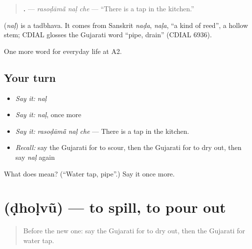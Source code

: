 \begin{quote}
\textbf{  .} — \emph{rasoḍāmā̃ naḷ che} — \textquotedblleft{}There is a tap in the kitchen.\textquotedblright{}
\end{quote}

\begin{cousinweb}
\textbf{} (\emph{naḷ}) is a tadbhava. It comes from Sanskrit \emph{naḍa}, \emph{naḷa}, \textquotedblleft{}a kind of reed\textquotedblright{}, a hollow stem; CDIAL glosses the Gujarati word \textquotedblleft{}pipe, drain\textquotedblright{} (CDIAL 6936).
\end{cousinweb}

\begin{grammarlens}[title={What you've built}]
One more word for everyday life at A2.
\end{grammarlens}

\subsection*{Your turn}
\begin{itemize}
\raggedright
  \item \emph{Say it:} \emph{naḷ}
  \item \emph{Say it:} \emph{naḷ}, once more
  \item \emph{Say it:} \emph{rasoḍāmā̃ naḷ che} — There is a tap in the kitchen.
  \item \emph{Recall:} say the Gujarati for to scour, then the Gujarati for to dry out, then say \emph{naḷ} again
\end{itemize}

\begin{tcolorbox}[breakable,colback=teal!4,colframe=teal!35!black,title={Before you move on}]
What does  mean? (\textquotedblleft{}Water tap, pipe\textquotedblright{}.) Say it once more.
\end{tcolorbox}
\section[\texorpdfstring{\gu{ઢોળવું} (ḍhoḷvũ)}{ઢોળવું (ḍhoḷvũ)}]{ (ḍhoḷvũ) — to spill, to pour out}

\label{lesson:GU-C159-dholvu}



\begin{quote}
Before the new one: say the Gujarati for to dry out, then the Gujarati for water tap.
\end{quote}

